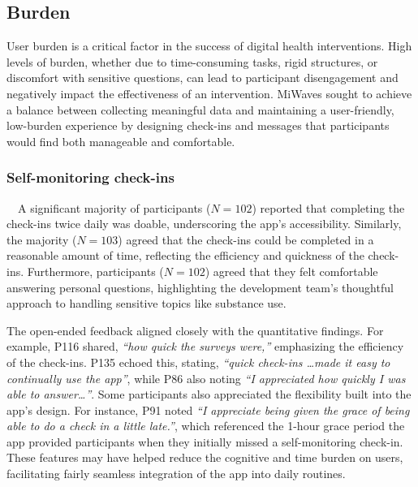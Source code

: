\subsection{Burden}
User burden is a critical factor in the success of digital health interventions. High levels of burden, whether due to time-consuming tasks, rigid structures, or discomfort with sensitive questions, can lead to participant disengagement and negatively impact the effectiveness of an intervention. 
MiWaves sought to achieve a balance between collecting meaningful data and maintaining a user-friendly, low-burden experience by designing check-ins and messages that participants would find both manageable and comfortable. 
\subsubsection{Self-monitoring check-ins}~\ A significant majority of participants ($N=102$) reported that completing the check-ins twice daily was doable, underscoring the app’s accessibility. Similarly, the majority ($N=103$) agreed that the check-ins could be completed in a reasonable amount of time, reflecting the efficiency and quickness of the check-ins. Furthermore, participants ($N=102$) agreed that they felt comfortable answering personal questions, highlighting the development team’s thoughtful approach to handling sensitive topics like substance use.

The open-ended feedback aligned closely with the quantitative findings. For example, P116 shared, \emph{``how quick the surveys were,''} emphasizing the efficiency of the check-ins. P135 echoed this, stating, \emph{``quick check-ins \ldots made it easy to continually use the app''}, while P86 also noting \emph{``I appreciated how quickly I was able to answer\ldots''}.
Some participants also appreciated the flexibility built into the app’s design. For instance, P91 noted \emph{``I appreciate being given the grace of being able to do a check in a little late.''}, which referenced the 1-hour grace period the app provided participants when they initially missed a self-monitoring check-in. 
These features may have helped reduce the cognitive and time burden on users, facilitating fairly seamless integration of the app into daily routines.

